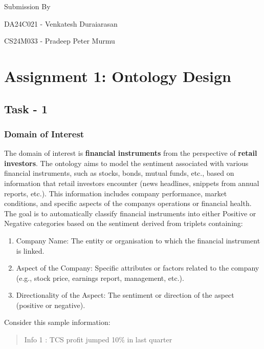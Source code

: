 \documentclass[
]{article}
\author{}
\date{}
\begin{document}
Submission By

DA24C021 - Venkatesh Duraiarasan

CS24M033 - Pradeep Peter Murmu

\tableofcontents

\section{Assignment 1: Ontology
Design}\label{assignment-1-ontology-design}

\subsection{Task - 1}\label{task---1}

\subsubsection{\texorpdfstring{Domain of Interest
}{Domain of Interest }}\label{domain-of-interest}

The domain of interest is \textbf{financial instruments} from the
perspective of \textbf{retail investors}. The ontology aims to model the
sentiment associated with various financial instruments, such as stocks,
bonds, mutual funds, etc., based on information that retail investors
encounter (news headlines, snippets from annual reports, etc.). This
information includes company performance, market conditions, and
specific aspects of the company\textquotesingle s operations or
financial health. The goal is to automatically classify financial
instruments into either Positive or Negative categories based on the
sentiment derived from triplets containing:

\begin{enumerate}
\def\labelenumi{\arabic{enumi}.}
\item
  Company Name: The entity or organisation to which the financial
  instrument is linked.
\item
  Aspect of the Company: Specific attributes or factors related to the
  company (e.g., stock price, earnings report, management, etc.).
\item
  Directionality of the Aspect: The sentiment or direction of the aspect
  (positive or negative).
\end{enumerate}

Consider this sample information:

\begin{quote}
Info 1 : TCS profit jumped 10\% in last quarter
\end{quote}
\end{document}
